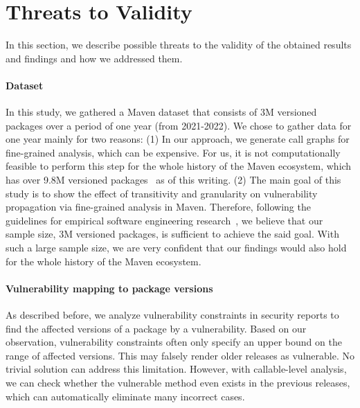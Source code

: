 \section{Threats to Validity}\label{ch3:sec:threats}
In this section, we describe possible threats to the validity of the obtained results and findings and how we addressed them.

\paragraph{Dataset}
In this study, we gathered a Maven dataset that consists of 3M versioned packages over a period of one year (from 2021-2022). We chose to gather data for one year mainly for two reasons: (1) In our approach, we generate call graphs for fine-grained analysis, which can be expensive. For us, it is not computationally feasible to perform this step for the whole history of the Maven ecosystem, which has over 9.8M versioned packages~\cite{mvn22} as of this writing. (2) The main goal of this study is to show the effect of transitivity and granularity on vulnerability propagation via fine-grained analysis in Maven. Therefore, following the guidelines for empirical software engineering research~\cite{Felderer2020ContemporaryEM}, we believe that our sample size, 3M versioned packages, is sufficient to achieve the said goal.
With such a large sample size, we are very confident that our findings would also hold for the whole history of the Maven ecosystem.


\paragraph{Vulnerability mapping to package versions}
As described before, we analyze vulnerability constraints in security reports to find the affected versions of a package by a vulnerability. Based on our observation, vulnerability constraints often only specify an upper bound on the range of affected versions.
This may falsely render older releases as vulnerable. No trivial solution can address this limitation.
However, with callable-level analysis, we can check whether the vulnerable method even exists in the previous releases, which can automatically eliminate many incorrect cases.

